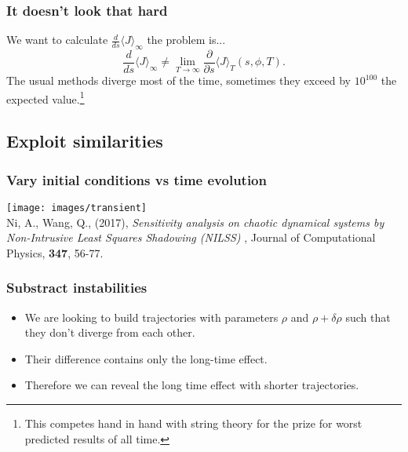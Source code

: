 \documentclass{beamer}
\begin{document}
\begin{frame}
  \frametitle{It doesn't look that hard}
  We want to calculate $\frac{d}{ds}\langle J \rangle_\infty $ the problem is...\pause
  \begin{equation}
    \frac{d}{ds} \langle J \rangle_\infty \neq \lim_{T\rightarrow \infty} \frac{\partial}{\partial s} \langle J \rangle_T (s,\phi,T).
  \end{equation}
  \pause
  The usual methods diverge most of the time, sometimes they exceed by $10^{100}$ the expected value.\footnote{This competes hand in hand with string theory for the prize for worst predicted results of all time.}
\end{frame}


\subsection{Exploit similarities}

\begin{frame}
  \frametitle{Vary initial conditions vs time evolution}
  \begin{center}

    \texttt{[image: images/transient]}\\


\tiny{Ni, A., Wang, Q., (2017), \textit{Sensitivity analysis on chaotic dynamical systems by Non-Intrusive Least Squares Shadowing (NILSS)} , Journal of Computational Physics, \textbf{347}, 56-77.}
\end{center}
\end{frame}


\begin{frame}
  \frametitle{Substract instabilities}

  \begin{itemize}
    \item We are looking to build trajectories with parameters $\rho$ and $\rho + \delta \rho$ such that they don't diverge from each other.\pause
    \item Their difference contains only the long-time effect.
    \item   Therefore we can reveal the long time effect with shorter trajectories.
  \end{itemize}
\end{frame}
\end{document}
